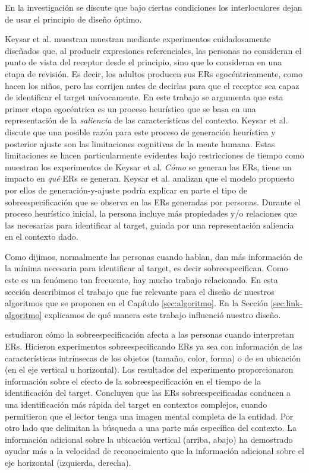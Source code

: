 En la investigaci\'on \cite{keysar:Curr98} se discute que bajo ciertas condiciones los interloculores dejan de usar el principio de dise\~no \'optimo. %

Keysar et al. muestran muestran mediante experimentos cuidadosamente dise\~nados que, al producir expresiones referenciales, las personas no consideran el punto de vista del receptor desde el principio, sino que lo consideran en una etapa de revisi\'on. Es decir, los adultos producen sus ERs egoc\'entricamente, como hacen los ni\~nos, pero las corrijen antes de decirlas para que el receptor sea capaz de identificar el target un\'ivocamente.
En este trabajo se argumenta que esta primer etapa egoc\'entrica es un proceso heur\'istico que se basa en una representaci\'on de la \emph{saliencia} de las caracter\'isticas del contexto. Keysar et al. discute que una posible raz\'on para este proceso de generaci\'on heur\'istica y posterior ajuste son las limitaciones cognitivas de la mente humana. Estas limitaciones se hacen particularmente evidentes bajo restricciones de tiempo como muestran los experimentos de Keysar et al.
\emph{C\'omo} se generan las ERs, tiene un impacto en \emph{qu\'e} ERs se generan. Keysar et al. analizan que el modelo propuesto por ellos de generaci\'on-y-ajuste podr\'ia explicar en parte el tipo de sobreespecificaci\'on que se observa en las ERs generadas por personas. Durante el proceso heur\'istico inicial, la persona incluye m\'as propiedades y/o relaciones que las necesarias para identificar al target, guiada por una representaci\'on saliencia en el contexto dado.

Como dijimos, normalmente las personas cuando hablan, dan m\'as informaci\'on de la m\'inima necesaria para identificar al target, es decir sobreespecifican. Como este es un fen\'omeno tan frecuente, hay mucho trabajo relacionado. En esta secci\'on describimos el trabajo que fue relevante para el dise\~no de nuestros algoritmos que se proponen en el Cap\'itulo \ref{sec:algoritmo}. En la Secci\'on \ref{sec:link-algoritmo} explicamos de qu\'e manera este trabajo influenci\'o nuestro dise\~no.

\cite{arts} estudiaron c\'omo la sobreespecificaci\'on afecta a las personas cuando interpretan ERs. Hicieron experimentos sobreespecificando ERs ya sea con informaci\'on de las caracter\'isticas intr\'insecas de los objetos (tama\~no, color, forma) o de su ubicaci\'on (en el eje vertical u horizontal). Los resultados del experimento
proporcionaron informaci\'on sobre el efecto de la sobreespecificaci\'on en el tiempo de la identificaci\'on del target.
Concluyen que las ERs sobreespecificadas conducen a una identificaci\'on m\'as r\'apida del target en contextos complejos, cuando permitieron que el lector 
tenga una imagen mental completa de la entidad. Por otro lado que delimitan la b\'usqueda a una parte m\'as espec\'ifica
del contexto. La informaci\'on adicional sobre la ubicaci\'on vertical (arriba, abajo) ha demostrado ayudar m\'as a la velocidad de reconocimiento que la informaci\'on adicional sobre el eje horizontal (izquierda, derecha).

